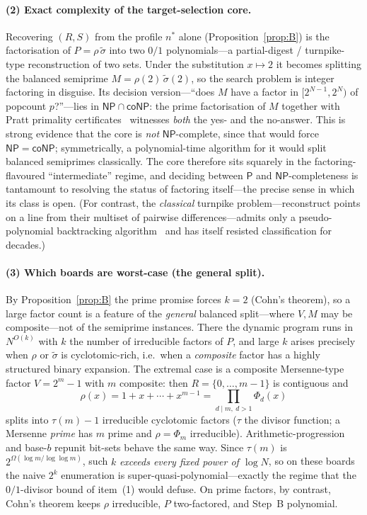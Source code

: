 \documentclass[11pt]{article}
\theoremstyle{definition}
\theoremstyle{plain}
\theoremstyle{remark}
\begin{document}
\paragraph{(2) Exact complexity of the target-selection core.}
Recovering $(R,S)$ from the profile $n^{*}$ alone (Proposition~\ref{prop:B}) is the
factorisation of $P=\rho\,\tilde\sigma$ into two $0/1$ polynomials---a partial-digest /
turnpike-type reconstruction of two sets. Under the substitution $x\mapsto2$ it becomes
splitting the balanced semiprime $M=\rho(2)\,\tilde\sigma(2)$, so the search problem is
integer factoring in disguise. Its decision version---``does $M$ have a factor in
$[2^{N-1},2^{N})$ of popcount $p$?''---lies in $\mathsf{NP}\cap\mathsf{coNP}$: the prime
factorisation of $M$ together with Pratt primality certificates~\cite{pratt} witnesses
\emph{both} the yes- and the no-answer. This is strong evidence that the core is \emph{not}
$\mathsf{NP}$-complete, since that would force $\mathsf{NP}=\mathsf{coNP}$; symmetrically,
a polynomial-time algorithm for it would split balanced semiprimes classically. The core
therefore sits squarely in the factoring-flavoured ``intermediate'' regime, and deciding
between $\mathsf{P}$ and $\mathsf{NP}$-completeness is tantamount to resolving the status of
factoring itself---the precise sense in which its class is open. (For contrast, the
\emph{classical} turnpike problem---reconstruct points on a line from their multiset of
pairwise differences---admits only a pseudo-polynomial backtracking
algorithm~\cite{ssl} and has itself resisted classification for decades.)

\paragraph{(3) Which boards are worst-case (the general split).}
By Proposition~\ref{prop:B} the prime promise forces $k=2$ (Cohn's theorem), so a large
factor count is a feature of the \emph{general} balanced split---where $V,M$ may be
composite---not of the semiprime instances. There the dynamic program runs in $N^{O(k)}$
with $k$ the number of irreducible factors of $P$, and large $k$ arises precisely when
$\rho$ or $\tilde\sigma$ is cyclotomic-rich, i.e.\ when a \emph{composite} factor has a
highly structured binary expansion. The extremal case is a composite Mersenne-type factor
$V=2^{m}-1$ with $m$ composite: then $R=\{0,\dots,m-1\}$ is contiguous and
\[
\rho(x)=1+x+\cdots+x^{m-1}=\prod_{d\mid m,\ d>1}\Phi_d(x)
\]
splits into $\tau(m)-1$ irreducible cyclotomic factors ($\tau$ the divisor function; a
Mersenne \emph{prime} has $m$ prime and $\rho=\Phi_m$ irreducible). Arithmetic-progression
and base-$b$ repunit bit-sets behave the same way. Since $\tau(m)$ is
$2^{\Omega(\log m/\log\log m)}$, such $k$ \emph{exceeds every fixed power of $\log N$}, so on
these boards the naive $2^{k}$ enumeration is super-quasi-polynomial---exactly the regime
that the $0/1$-divisor bound of item~(1) would defuse. On prime factors, by contrast, Cohn's
theorem keeps $\rho$ irreducible, $P$ two-factored, and Step~B polynomial.
\end{document}
